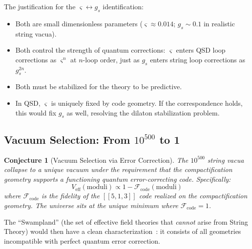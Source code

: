 \documentclass[11pt,a4paper]{article}
\newtheorem{conjecture}[theorem]{Conjecture}
\theoremstyle{definition}
\newcommand{\strain}{\varsigma}            %
\newcommand{\gs}{g_s}
\begin{document}
The justification for the $\strain \leftrightarrow \gs$ identification:
\begin{itemize}[nosep]
    \item Both are small dimensionless parameters ($\strain \approx 0.014$;
          $\gs \sim 0.1$ in realistic string vacua).
    \item Both control the strength of quantum corrections: $\strain$
          enters QSD loop corrections as $\strain^n$ at $n$-loop order, just
          as $\gs$ enters string loop corrections as $\gs^{2n}$.
    \item Both must be stabilized for the theory to be predictive.
    \item In QSD, $\strain$ is uniquely fixed by code geometry.  If the
          correspondence holds, this would fix $\gs$ as well, resolving the
          dilaton stabilization problem.
\end{itemize}

\subsection{Vacuum Selection: From $10^{500}$ to 1}

\begin{conjecture}[Vacuum Selection via Error Correction]
\label{conj:vacuum}
The $10^{500}$ string vacua collapse to a unique vacuum under the
requirement that the compactification geometry supports a functioning
quantum error-correcting code.  Specifically:
\begin{equation}
V_{\text{eff}}(\text{moduli}) \propto 1 - \mathcal{F}_{\text{code}}(\text{moduli})
\end{equation}
where $\mathcal{F}_{\text{code}}$ is the fidelity of the $[[5,1,3]]$ code
realized on the compactification geometry.  The universe sits at the unique
minimum where $\mathcal{F}_{\text{code}} = 1$.
\end{conjecture}

The ``Swampland'' (the set of effective field theories that \emph{cannot}
arise from String Theory) would then have a clean characterization~\cite{Vafa2005}: it
consists of all geometries incompatible with perfect quantum error
correction.
\end{document}
